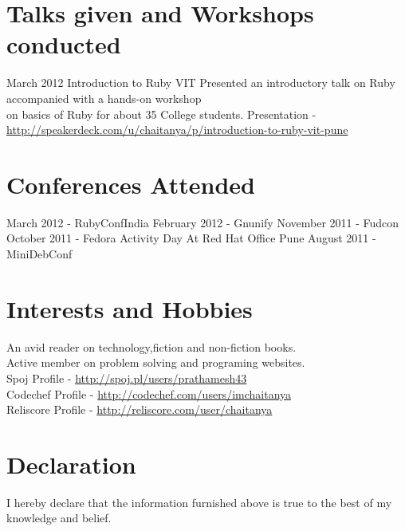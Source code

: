 \documentclass[11pt,a4paper]{moderncv}
\begin{document}
\section{Talks given and Workshops conducted}
\cventry
        {March 2012}
        {Introduction to Ruby}
        {VIT}
        {}
        {}
        {
         Presented an introductory talk on Ruby accompanied with a 
         hands-on workshop \\
         on basics of Ruby for about 35 College students.
         Presentation - \url{http://speakerdeck.com/u/chaitanya/p/introduction-to-ruby-vit-pune}
        }

\section{Conferences Attended}

\cvlistitem
         {March 2012 - RubyConfIndia }
\cvlistitem
         {February 2012 - Gnunify }
\cvlistitem
         {November 2011 - Fudcon }
\cvlistitem
         {October 2011 - Fedora Activity Day At Red Hat Office Pune}
\cvlistitem
         {August 2011 - MiniDebConf }\\

\section{Interests and Hobbies}

\cvlistitem
           {An avid reader on technology,fiction and non-fiction books.\\}
\cvlistitem
           {
            Active member on problem solving and programing websites.\\
            Spoj Profile -          \url{http://spoj.pl/users/prathamesh43}   \\
            Codechef Profile -      \url{http://codechef.com/users/imchaitanya}\\
            Reliscore Profile -     \url{http://reliscore.com/user/chaitanya}
          }

  

\section{Declaration}
\cvlistitem
            {
             I hereby declare that the information furnished 
             above is true to the best of 
             my knowledge and belief.\\ \\ \\
            }
\end{document}

